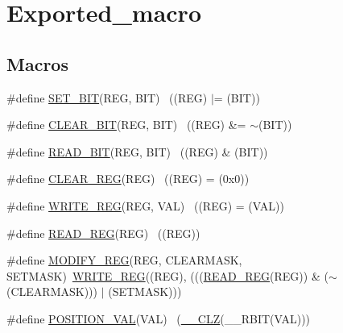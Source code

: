\hypertarget{group___exported__macro}{}\section{Exported\+\_\+macro}
\label{group___exported__macro}
\subsection*{Macros}
\begin{DoxyCompactItemize}
\item 
\#define \hyperlink{group___exported__macro_gafe96f32216ed830403db91a8b7d800ab}{S\+E\+T\+\_\+\+B\+IT}(R\+EG,  B\+IT)      ~((R\+EG) $\vert$= (B\+IT))
\item 
\#define \hyperlink{group___exported__macro_ga4c7b1529ef62c6310390108b0efc2bf0}{C\+L\+E\+A\+R\+\_\+\+B\+IT}(R\+EG,  B\+IT)  ~((R\+EG) \&= $\sim$(B\+IT))
\item 
\#define \hyperlink{group___exported__macro_ga8e897a88f6313cd46cf96224a47f11bf}{R\+E\+A\+D\+\_\+\+B\+IT}(R\+EG,  B\+IT)    ~((R\+EG) \& (B\+IT))
\item 
\#define \hyperlink{group___exported__macro_gad659fe5750e80990cb29b7b69562536e}{C\+L\+E\+A\+R\+\_\+\+R\+EG}(R\+EG)            ~((R\+EG) = (0x0))
\item 
\#define \hyperlink{group___exported__macro_gaf244d5e7076977aaa554cf2dab8bdbaa}{W\+R\+I\+T\+E\+\_\+\+R\+EG}(R\+EG,  V\+AL)  ~((R\+EG) = (V\+AL))
\item 
\#define \hyperlink{group___exported__macro_gaddb3cc7b2dc9c558f8fdb7b6fae4ec41}{R\+E\+A\+D\+\_\+\+R\+EG}(R\+EG)              ~((R\+EG))
\item 
\#define \hyperlink{group___exported__macro_ga6553c99f510c3bab8cc0a91602053247}{M\+O\+D\+I\+F\+Y\+\_\+\+R\+EG}(R\+EG,  C\+L\+E\+A\+R\+M\+A\+SK,  S\+E\+T\+M\+A\+SK)~\hyperlink{group___exported__macro_gaf244d5e7076977aaa554cf2dab8bdbaa}{W\+R\+I\+T\+E\+\_\+\+R\+EG}((R\+EG), (((\hyperlink{group___exported__macro_gaddb3cc7b2dc9c558f8fdb7b6fae4ec41}{R\+E\+A\+D\+\_\+\+R\+EG}(R\+EG)) \& ($\sim$(C\+L\+E\+A\+R\+M\+A\+SK))) $\vert$ (S\+E\+T\+M\+A\+SK)))
\item 
\#define \hyperlink{group___exported__macro_gaa8bd317fc11c9c53b3822dbfa03ede96}{P\+O\+S\+I\+T\+I\+O\+N\+\_\+\+V\+AL}(V\+AL)      ~(\hyperlink{group___c_m_s_i_s___core___instruction_interface_ga5d5bb1527e042be4a9fa5a33f65cc248}{\+\_\+\+\_\+\+C\+LZ}(\+\_\+\+\_\+\+R\+B\+IT(V\+AL)))
\end{DoxyCompactItemize}


